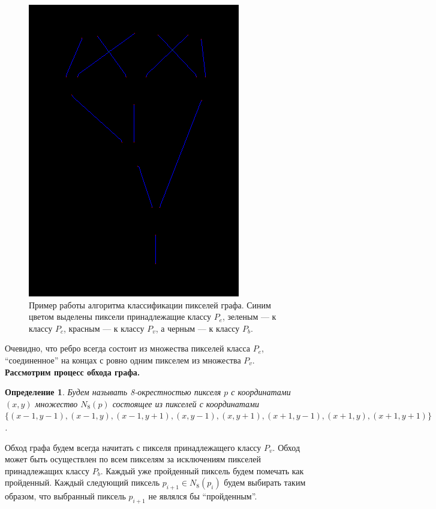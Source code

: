 \documentclass[makeidx, a4paper, 14pt]{extarticle}
\newtheorem{definition}{Определение}
\begin{document}
\begin{figure}[H]
    \centering
    \includegraphics[scale=0.85]{img4_classified.png}
    \caption{Пример работы алгоритма классификации пикселей графа. Синим цветом выделены пиксели принадлежащие классу $P_e$, зеленым --- к классу $P_c$, красным --- к классу $P_v$, а черным --- к классу $P_b$.}
    \label{fig:img4_classified}
\end{figure}

Очевидно, что ребро всегда состоит из множества пикселей класса $P_e$, ``соединенное'' на концах с ровно одним пикселем из множества $P_v$. \\

\textbf{Рассмотрим процесс обхода графа.}
\begin{definition}
    Будем называть 8-окрестностью пикселя ${p}$ с координатами ${(x, y)}$ множество $N_8(p)$ состоящее из пикселей с координатами
    $\{(x-1, y-1), (x-1, y), (x-1, y+1), (x, y-1), (x, y+1), (x+1, y-1), (x+1, y), (x+1, y+1)\}$.
\end{definition}

Обход графа будем всегда начитать с пикселя принадлежащего классу $P_v$. Обход может быть осуществлен по всем пикселям за исключениям
пикселей принадлежащих классу $P_b$. Каждый уже пройденный пиксель будем помечать как пройденный.
Каждый следующий пиксель $p_{i+1} \in N_8(p_i)$ будем выбирать таким образом,
что выбранный пиксель $p_{i+1}$ не являлся бы ``пройденным''. \\
\end{document}
